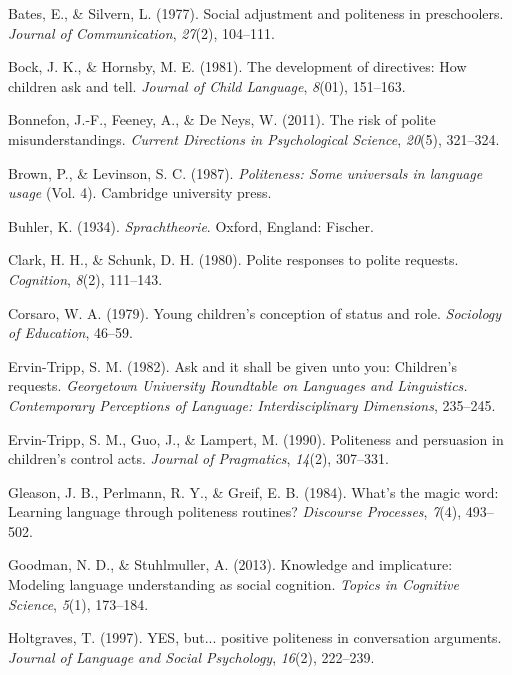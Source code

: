 \documentclass[10pt, letterpaper]{article}
\begin{document}
\hypertarget{ref-bates1977}{}
Bates, E., \& Silvern, L. (1977). Social adjustment and politeness in
preschoolers. \emph{Journal of Communication}, \emph{27}(2), 104--111.

\hypertarget{ref-bock1981}{}
Bock, J. K., \& Hornsby, M. E. (1981). The development of directives:
How children ask and tell. \emph{Journal of Child Language},
\emph{8}(01), 151--163.

\hypertarget{ref-bonnefon2011}{}
Bonnefon, J.-F., Feeney, A., \& De Neys, W. (2011). The risk of polite
misunderstandings. \emph{Current Directions in Psychological Science},
\emph{20}(5), 321--324.

\hypertarget{ref-brown1987}{}
Brown, P., \& Levinson, S. C. (1987). \emph{Politeness: Some universals
in language usage} (Vol. 4). Cambridge university press.

\hypertarget{ref-buhler1934}{}
Buhler, K. (1934). \emph{Sprachtheorie}. Oxford, England: Fischer.

\hypertarget{ref-clark1980}{}
Clark, H. H., \& Schunk, D. H. (1980). Polite responses to polite
requests. \emph{Cognition}, \emph{8}(2), 111--143.

\hypertarget{ref-corsaro1979}{}
Corsaro, W. A. (1979). Young children's conception of status and role.
\emph{Sociology of Education}, 46--59.

\hypertarget{ref-ervin1982}{}
Ervin-Tripp, S. M. (1982). Ask and it shall be given unto you:
Children's requests. \emph{Georgetown University Roundtable on Languages
and Linguistics. Contemporary Perceptions of Language: Interdisciplinary
Dimensions}, 235--245.

\hypertarget{ref-ervin1990}{}
Ervin-Tripp, S. M., Guo, J., \& Lampert, M. (1990). Politeness and
persuasion in children's control acts. \emph{Journal of Pragmatics},
\emph{14}(2), 307--331.

\hypertarget{ref-gleason1984}{}
Gleason, J. B., Perlmann, R. Y., \& Greif, E. B. (1984). What's the
magic word: Learning language through politeness routines?
\emph{Discourse Processes}, \emph{7}(4), 493--502.

\hypertarget{ref-goodman2013}{}
Goodman, N. D., \& Stuhlmuller, A. (2013). Knowledge and implicature:
Modeling language understanding as social cognition. \emph{Topics in
Cognitive Science}, \emph{5}(1), 173--184.

\hypertarget{ref-holtgraves1997}{}
Holtgraves, T. (1997). YES, but... positive politeness in conversation
arguments. \emph{Journal of Language and Social Psychology},
\emph{16}(2), 222--239.
\end{document}
